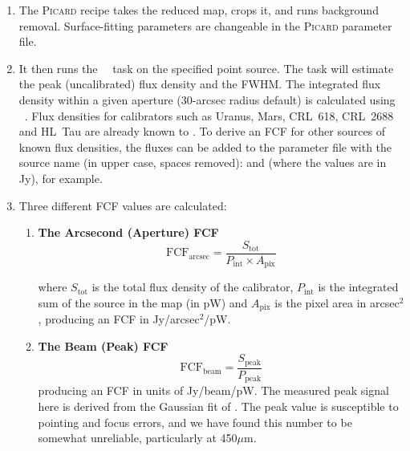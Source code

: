 \begin{enumerate}
\item The \textsc{Picard} recipe  takes the
  reduced map, crops it, and runs background removal. Surface-fitting
  parameters are changeable in the \textsc{Picard} parameter file.

\item It then runs the \Kappa\ \beamfit\ task on the specified point
  source. The  task will estimate the peak
  (uncalibrated) flux density and the FWHM. The integrated flux
  density within a given aperture (30-arcsec radius default) is
  calculated using \photom\ \autophotom. Flux densities for
  calibrators such as Uranus, Mars, CRL~618, CRL~2688 and HL~Tau are
  already known to \picard. To derive an FCF for other sources of
  known flux densities, the fluxes can be added to the parameter file
  with the source name (in upper case, spaces
  removed): 
  and  (where the values are in Jy),
  for example.

\item Three different FCF values are calculated:

  \begin{enumerate}

  \item \textbf{The Arcsecond (Aperture) FCF}
    \begin{equation}
      \label{eq:fcf_arcsec}
      \mathrm{FCF_{arcsec}} = \frac{S_{\mathrm{tot}}}{P_{\mathrm{int}} \times
        A_{\mathrm{pix}}}
    \end{equation}

    where $S_{\mathrm{tot}}$ is the total flux density of the
    calibrator, $P_{\mathrm{int}}$ is the integrated sum of the source
    in the map (in pW) and $A_{\mathrm{pix}}$ is the pixel area in
    arcsec$^2$, producing an FCF in Jy/arcsec$^2$/pW.

   \vspace{3mm}

  \item\textbf{The Beam (Peak) FCF}
    \begin{equation}
      \label{eq:fcf_beam}
      \mathrm{FCF_{beam}} = \frac{S_{\mathrm{peak}}}{P_{\mathrm{peak}}}
    \end{equation}
    producing an FCF in units of Jy/beam/pW. The measured peak signal here is 
    derived from the Gaussian fit of . The peak value is susceptible 
    to pointing and focus errors, and we have found this number to be somewhat unreliable,
    particularly at 450$\mu$m.
    

\end{enumerate}
\end{enumerate}
